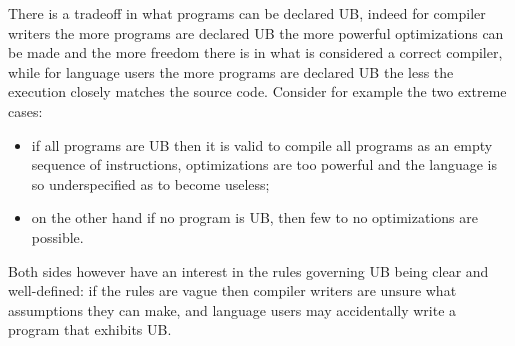 \documentclass[a4paper,11pt]{article}
\theoremstyle{plain}
\theoremstyle{definition}
\theoremstyle{remark}
\begin{document}
There is a tradeoff in what programs can be declared UB, indeed for compiler writers
the more programs are declared UB the more powerful optimizations can be made and
the more freedom there is in what is considered a correct compiler, while for language
users the more programs are declared UB the less the execution closely matches the source
code. Consider for example the two extreme cases:
\begin{itemize}
    \item if all programs are UB then it is valid to compile all programs as an
        empty sequence of instructions, optimizations are too powerful and the language
        is so underspecified as to become useless;
    \item on the other hand if no program is UB, then few to no optimizations are possible.
\end{itemize}
Both sides however have an interest in the rules governing UB being clear and well-defined:
if the rules are vague then compiler writers are unsure what assumptions they can make,
and language users may accidentally write a program that exhibits UB.
\end{document}
